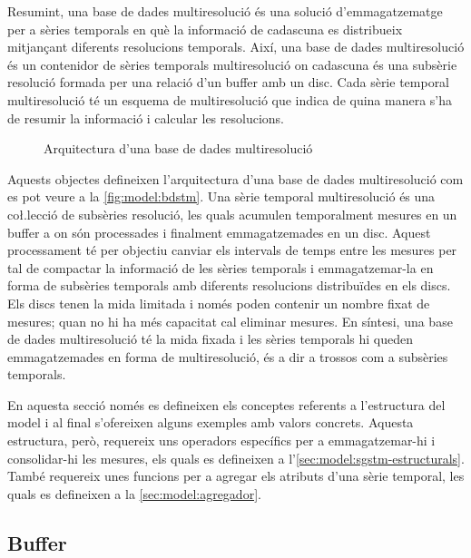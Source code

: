 Resumint, una base de dades multiresolució és una solució
d'emmagatzematge per a sèries temporals en què la informació de
cadascuna es distribueix mitjançant diferents resolucions
temporals. Així, una base de dades multiresolució és un contenidor de
sèries temporals multiresolució on cadascuna és una subsèrie resolució
formada per una relació d'un buffer amb un disc. Cada sèrie temporal
multiresolució té un esquema de multiresolució que indica de quina
manera s'ha de resumir la informació i calcular les resolucions.

\begin{figure}[tp]
\centering

\caption{Arquitectura d'una base de dades multiresolució}
\label{fig:model:bdstm}
\end{figure}




Aquests objectes defineixen l'arquitectura d'una base de dades
multiresolució com es pot veure a la \autoref{fig:model:bdstm}.  Una
sèrie temporal multiresolució és una co\l.lecció de subsèries
resolució, les quals acumulen temporalment mesures en un buffer a on
són processades i finalment emmagatzemades en un disc. Aquest
processament té per objectiu canviar els intervals de temps entre les
mesures per tal de compactar la informació de les sèries temporals i
emmagatzemar-la en forma de subsèries temporals amb diferents
resolucions distribuïdes en els discs. Els discs tenen la mida
limitada i només poden contenir un nombre fixat de mesures; quan no hi
ha més capacitat cal eliminar mesures.  En síntesi, una base de dades
multiresolució té la mida fixada i les sèries temporals hi queden
emmagatzemades en forma de multiresolució, és a dir a trossos com a
subsèries temporals.


En aquesta secció només es defineixen els conceptes referents a
l'estructura del model i al final s'ofereixen alguns exemples amb
valors concrets. Aquesta estructura, però, requereix uns operadors
específics per a emmagatzemar-hi i consolidar-hi les mesures, els
quals es defineixen a
l'\autoref{sec:model:sgstm-estructurals}. També requereix unes
funcions per a agregar els atributs d'una sèrie temporal, les quals
es defineixen a la \autoref{sec:model:agregador}.




\subsection{Buffer}\label{sec:model:buffer}



